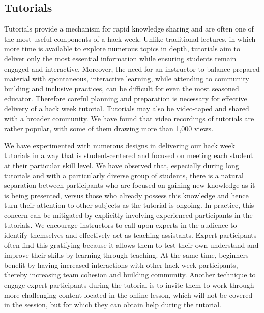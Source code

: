 \documentclass{aastex62}
\begin{document}
\subsection{Tutorials}
Tutorials provide a mechanism for rapid knowledge sharing and are often one of the most useful components of a hack week. Unlike traditional lectures, in which more time is available to explore numerous topics in depth, tutorials aim to deliver only the most essential information while ensuring students remain engaged and interactive. Moreover, the need for an instructor to balance prepared material with spontaneous, interactive learning, while attending to community building and inclusive practices, can be difficult for even the most seasoned educator. Therefore careful planning and preparation is necessary for effective delivery of a hack week tutorial. Tutorials may also be video-taped and shared with a broader community. We have found that video recordings of tutorials are rather popular, with some of them drawing more than 1,000 views.

We have experimented with numerous designs in delivering our hack week tutorials in a way that is student-centered and focused on meeting each student at their particular skill level. We have observed that, especially during long tutorials and with a particularly diverse group of students, there is a natural separation between participants who are focused on gaining new knowledge as it is being presented, versus those who already possess this knowledge and hence turn their attention to other subjects as the tutorial is ongoing. In practice, this concern can be mitigated by explicitly involving experienced participants in the tutorials. We encourage instructors to call upon experts in the audience to identify themselves and effectively act as teaching assistants. Expert participants often find this gratifying because it allows them to test their own understand and improve their skills by learning through teaching. At the same time, beginners benefit by having increased interactions with other hack week participants, thereby increasing team cohesion and building community. Another technique to engage expert participants during the tutorial is to invite them to work through more challenging content located in the online lesson, which will not be covered in the session, but for which they can obtain help during the tutorial.
\end{document}
